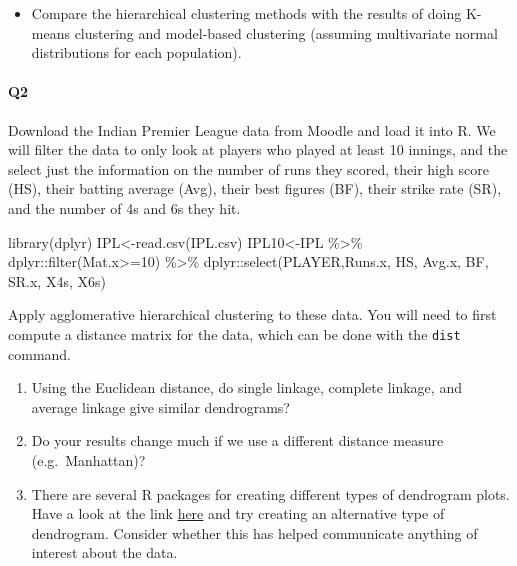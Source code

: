 \documentclass[
]{book}
\newenvironment{Shaded}{\begin{snugshade}}{\end{snugshade}}
\newcommand{\DecValTok}[1]{\textcolor[rgb]{0.00,0.00,0.81}{#1}}
\newcommand{\FunctionTok}[1]{\textcolor[rgb]{0.00,0.00,0.00}{#1}}
\newcommand{\NormalTok}[1]{#1}
\newcommand{\OtherTok}[1]{\textcolor[rgb]{0.56,0.35,0.01}{#1}}
\newcommand{\SpecialCharTok}[1]{\textcolor[rgb]{0.00,0.00,0.00}{#1}}
\newcommand{\StringTok}[1]{\textcolor[rgb]{0.31,0.60,0.02}{#1}}
\providecommand{\tightlist}{%
  \setlength{\itemsep}{0pt}\setlength{\parskip}{0pt}}
\theoremstyle{definition}
\theoremstyle{definition}
\theoremstyle{definition}
\theoremstyle{definition}
\theoremstyle{remark}
\begin{document}
\begin{itemize}
\tightlist
\item
  Compare the hierarchical clustering methods with the results of doing K-means clustering and model-based clustering (assuming multivariate normal distributions for each population).
\end{itemize}

\hypertarget{q2}{%
\paragraph*{Q2}\label{q2}}

Download the Indian Premier League data from Moodle and load it into R. We will filter the data to only look at players who played at least 10 innings, and the select just the information on the number of runs they scored, their high score (HS), their batting average (Avg), their best figures (BF), their strike rate (SR), and the number of 4s and 6s they hit.

\begin{Shaded}
\begin{Highlighting}[]
\FunctionTok{library}\NormalTok{(dplyr)}
\NormalTok{IPL}\OtherTok{\textless{}{-}}\FunctionTok{read.csv}\NormalTok{(}\StringTok{\textquotesingle{}IPL.csv\textquotesingle{}}\NormalTok{)}
\NormalTok{IPL10}\OtherTok{\textless{}{-}}\NormalTok{IPL }\SpecialCharTok{\%\textgreater{}\%}\NormalTok{ dplyr}\SpecialCharTok{::}\FunctionTok{filter}\NormalTok{(Mat.x}\SpecialCharTok{\textgreater{}=}\DecValTok{10}\NormalTok{) }\SpecialCharTok{\%\textgreater{}\%}
\NormalTok{  dplyr}\SpecialCharTok{::}\FunctionTok{select}\NormalTok{(PLAYER,Runs.x, HS, Avg.x, BF, SR.x, X4s, X6s)}
\end{Highlighting}
\end{Shaded}

Apply agglomerative hierarchical clustering to these data. You will need to first compute a distance matrix for the data, which can be done with the \texttt{dist} command.

\begin{enumerate}
\def\labelenumi{\roman{enumi}.}
\item
  Using the Euclidean distance, do single linkage, complete linkage, and average linkage give similar dendrograms?
\item
  Do your results change much if we use a different distance measure (e.g.~Manhattan)?
\item
  There are several R packages for creating different types of dendrogram plots. Have a look at the link \href{http://www.sthda.com/english/wiki/beautiful-dendrogram-visualizations-in-r-5-must-known-methods-unsupervised-machine-learning}{here} and try creating an alternative type of dendrogram. Consider whether this has helped communicate anything of interest about the data.
\end{enumerate}
\end{document}
